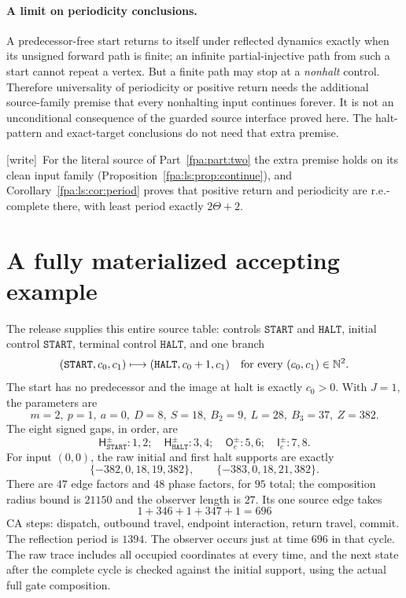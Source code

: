 \documentclass[11pt,a4paper]{article}
\numberwithin{equation}{section}
\newcommand{\N}{\mathbb N}\newcommand{\Z}{\mathbb Z}\newcommand{\R}{\mathbb R}
\newcommand{\Hh}{\mathsf H}\newcommand{\Oo}{\mathsf O}\newcommand{\Ii}{\mathsf I}\newcommand{\HH}{\mathsf H}
\newcommand{\wtag}{\textup{[write]}}
\begin{document}
\paragraph{A limit on periodicity conclusions.}
A predecessor-free start returns to itself under reflected dynamics exactly
when its unsigned forward path is finite; an infinite partial-injective path
from such a start cannot repeat a vertex. But a finite path may stop at a
\emph{nonhalt} control. Therefore universality of periodicity or positive
return needs the additional source-family premise that every nonhalting input
continues forever. It is not an unconditional consequence of the guarded
source interface proved here. The halt-pattern and exact-target conclusions
do not need that extra premise.

\wtag\ For the literal source of Part~\ref{fpa:part:two} the extra premise holds on its clean input family (Proposition~\ref{fpa:ls:prop:continue}), and Corollary~\ref{fpa:ls:cor:period} proves that positive return and periodicity are r.e.-complete there, with least period exactly $2\Theta+2$.

\section{A fully materialized accepting example}\label{fpa:sec:example}
The release supplies this entire source table: controls $\mathtt{START}$ and
$\mathtt{HALT}$, initial control $\mathtt{START}$, terminal control
$\mathtt{HALT}$, and one branch
\[
 (\mathtt{START},c_0,c_1)\longmapsto
 (\mathtt{HALT},c_0+1,c_1) \quad\hbox{for every }(c_0,c_1)\in\N^2.
\]
The start has no predecessor and the image at halt is exactly $c_0>0$.
With $J=1$, the parameters are
\[
 m=2,\ p=1,\ a=0,\ D=8,\ S=18,\ B_2=9,\ L=28,\ B_3=37,\ Z=382.
\]
The eight signed gaps, in order, are
\[
 \Hh_{\mathtt{START}}^\pm:1,2;\quad
 \Hh_{\mathtt{HALT}}^\pm:3,4;\quad
 \Oo_e^\pm:5,6;\quad \Ii_e^\pm:7,8.
\]
For input $(0,0)$, the raw initial and first halt supports are exactly
\[
 \{-382,0,18,19,382\},\qquad \{-383,0,18,21,382\}.
\]
There are $47$ edge factors and $48$ phase factors, for $95$ total; the
composition radius bound is $21150$ and the observer length is $27$. Its
one source edge takes
\[
 1+346+1+347+1=696
\]
CA steps: dispatch, outbound travel, endpoint interaction, return travel,
commit. The reflection period is $1394$. The observer occurs just at time
$696$ in that cycle. The raw trace includes all occupied coordinates at every
time, and the next state after the complete cycle is checked against the
initial support, using the actual full gate composition.
\end{document}
